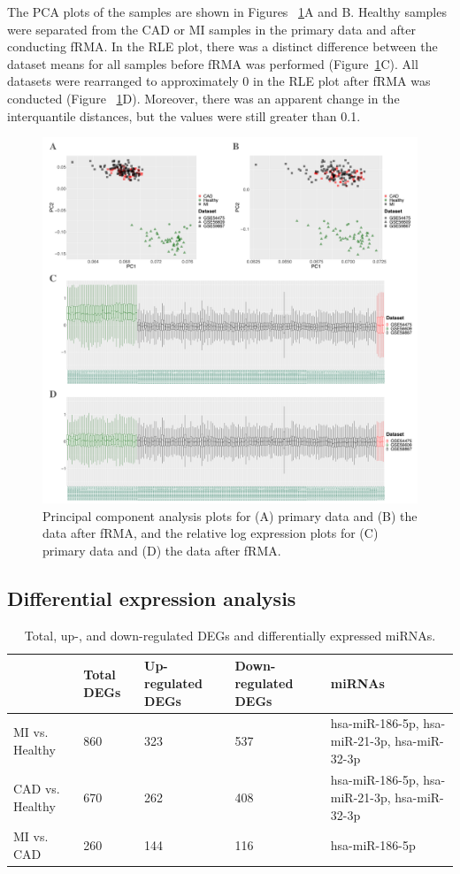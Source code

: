 \documentclass[sn-mathphys,Numbered]{sn-jnl}%
\theoremstyle{thmstyleone}%
\theoremstyle{thmstyletwo}%
\theoremstyle{thmstylethree}%
\begin{document}
The PCA plots of the samples are shown in Figures ~\ref{fig:PCA}A and B.
Healthy samples were separated from the CAD or MI samples in the primary
data and after conducting fRMA. In the RLE plot, there was a distinct
difference between the dataset means for all samples before fRMA was
performed (Figure~\ref{fig:PCA}C). All datasets were rearranged to
approximately 0 in the RLE plot after fRMA was conducted (Figure
~\ref{fig:PCA}D). Moreover, there was an apparent change in the
interquantile distances, but the values were still greater than 0.1.

\begin{figure}
\centering
\includegraphics[width=1\linewidth]{PCA and RLE of trains} \caption{Principal component analysis plots for (A) primary data and (B) the data after fRMA, and the relative log expression plots for (C) primary data and (D) the data after fRMA.}
\label{fig:PCA}
\end{figure}

\subsection{Differential expression
analysis}\label{differential-expression-analysis-1}


\begin{table}
\centering
\caption{Total, up-, and down-regulated DEGs and differentially expressed miRNAs.}
\label{tab:DEGstab}
\begin{tabularx}{\textwidth}{XXXXX}
\hline
& Total DEGs & Up-regulated DEGs & Down-regulated DEGs & miRNAs\\
\hline
MI vs. Healthy & 860 & 323 & 537 & hsa-miR-186-5p, hsa-miR-21-3p, hsa-miR-32-3p\\
CAD vs. Healthy & 670 & 262 & 408 & hsa-miR-186-5p, hsa-miR-21-3p, hsa-miR-32-3p\\
MI vs. CAD & 260 & 144 & 116 & hsa-miR-186-5p\\
\hline
\end{tabularx}
\end{table}
\end{document}
